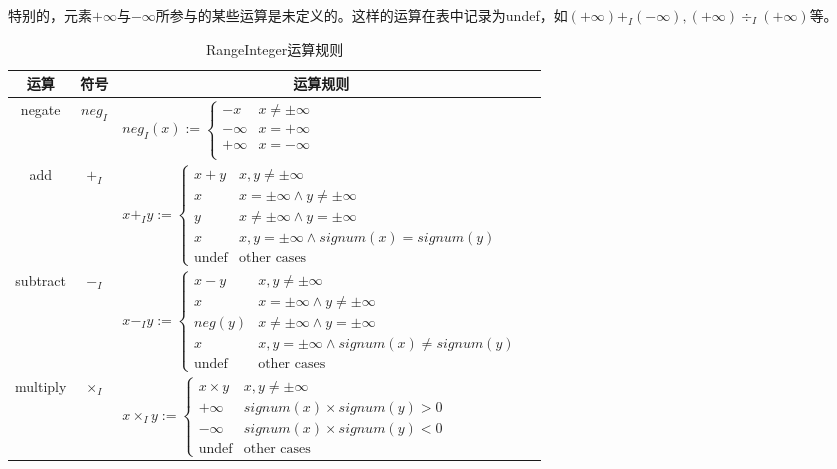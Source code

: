 特别的，元素$ +\infty $与$ -\infty $所参与的某些运算是未定义的。这样的运算在表中记录为undef，如$ (+\infty) +_I (-\infty), (+\infty) \div_I (+\infty)  $等。

\begin{table}[H]
	\centering
	\begin{minipage}[t]{0.85\linewidth} 
		\caption[RangeInteger运算规则]{RangeInteger运算规则}
		\label{tab:Integer运算规则}
		\begin{tabularx}{\linewidth}{cclc}
			\toprule[1.5pt]
			{\heiti 运算} & {\heiti 符号} & \multicolumn{1}{c}{\heiti 运算规则} \\\midrule[1pt]
			
			negate & $ neg_I $ & $  neg_I(x) :=  \begin{cases}
				-x & x \ne \pm\infty\\
				-\infty & x = +\infty\\
				+\infty & x = -\infty\\
			\end{cases}$\\
			
			add &$  +_I $ & $ x +_I y :=  \begin{cases}
				x + y & x, y \ne \pm\infty\\
				x & x = \pm\infty \land y \ne \pm\infty\\
				y & x \ne \pm\infty \land y = \pm\infty\\
				x & x, y = \pm\infty \land signum(x) = signum(y) \\
				\text{undef} & \text{other cases}
			\end{cases}$ \\
			
			subtract & $ -_I $ & $ x -_I y := \begin{cases}
				x - y & x, y \ne \pm\infty\\
				x & x = \pm\infty \land y \ne \pm\infty\\
				neg(y) & x \ne \pm\infty \land y = \pm\infty\\
				x & x, y = \pm\infty \land signum(x) \ne signum(y) \\
				\text{undef} & \text{other cases}
			\end{cases} $\\
			
			multiply & $ \times_I $ & $ x \times_I y := \begin{cases}
				x \times y & x, y \ne \pm\infty\\
				+\infty & signum(x) \times signum(y) > 0\\
				-\infty & signum(x) \times signum(y) < 0\\
				\text{undef} & \text{other cases}
			\end{cases} $\\
			

\end{tabularx}
\end{minipage}
\end{table}
